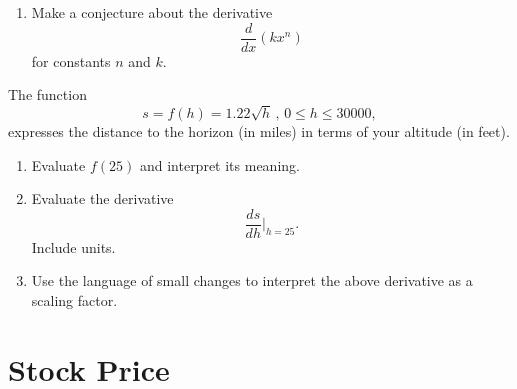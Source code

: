 \documentclass{ximera}
\begin{document}
\begin{question}
\begin{enumerate}
\begin{onlineOnly}
    \begin{center}
\end{center}
\end{onlineOnly}

\href{https://www.desmos.com/calculator/qcolims10c}{151: Printers Error 3}

\emph{Without} sketching a graph, drag the slider $m$ so that the blue line is tangent to the curve $y=234x^6$ at $A$. Explain your reasoning.

\item Make a conjecture about the derivative
\[
  \frac{d}{dx}\left(k x^n \right)
\]
for constants $n$ and $k$.
\end{enumerate}
\end{question}



\begin{question} \label{QDf3e4e33r}

\item The function
\[
     s = f(h) = 1.22 \sqrt{h} \, , \, 0\leq h \leq 30000 ,
\]
expresses the distance to the horizon (in miles) in terms of your altitude (in feet).

\begin{enumerate}
\item Evaluate $f(25)$ and interpret its meaning.

\item Evaluate the derivative 
\[
    \frac{ds}{dh}\Big|_{h=25} .
\]
Include units.

\item Use the language of small changes to interpret the above derivative as a scaling factor.

\end{enumerate}

\end{question}




\section{Stock Price}
\end{document}
